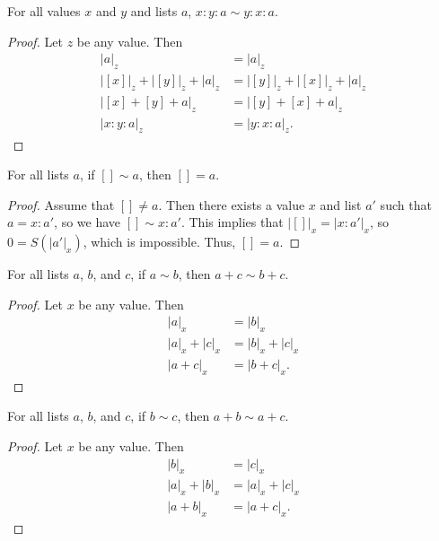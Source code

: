 \documentclass[../math.tex]{subfiles}
\begin{document}
\begin{theorem} \label{list-perm-swap}
    For all values $x$ and $y$ and lists $a$, $x : y : a \sim y : x : a$.
\end{theorem}
\begin{proof}
    Let $z$ be any value.  Then
    \begin{align*}
        |a|_z &= |a|_z \\
        |[x]|_z + |[y]|_z + |a|_z &= |[y]|_z + |[x]|_z + |a|_z \\
        |[x] + [y] + a|_z &= |[y] + [x] + a|_z \\
        |x : y : a|_z &= |y : x : a|_z.
    \end{align*}
\end{proof}

\begin{theorem} \label{list-perm-nil-eq}
    For all lists $a$, if $[] \sim a$, then $[] = a$.
\end{theorem}
\begin{proof}
    Assume that $[] \neq a$.  Then there exists a value $x$ and list $a'$ such
    that $a = x : a'$, so we have $[] \sim x : a'$.  This implies that $|[]|_x =
    |x : a'|_x$, so $0 = S(|a'|_x)$, which is impossible.  Thus, $[] = a$.
\end{proof}

\begin{theorem} \label{list-perm-lpart}
    For all lists $a$, $b$, and $c$, if $a \sim b$, then $a + c \sim b + c$.
\end{theorem}
\begin{proof}
    Let $x$ be any value.  Then
    \begin{align*}
        |a|_x &= |b|_x \\
        |a|_x + |c|_x &= |b|_x + |c|_x \\
        |a + c|_x &= |b + c|_x.
    \end{align*}
\end{proof}

\begin{theorem} \label{list-perm-rpart}
    For all lists $a$, $b$, and $c$, if $b \sim c$, then $a + b \sim a + c$.
\end{theorem}
\begin{proof}
    Let $x$ be any value.  Then
    \begin{align*}
        |b|_x &= |c|_x \\
        |a|_x + |b|_x &= |a|_x + |c|_x \\
        |a + b|_x &= |a + c|_x.
    \end{align*}
\end{proof}
\end{document}
